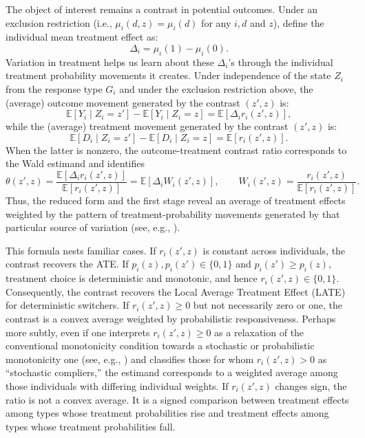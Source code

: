 \documentclass[11pt]{article}
\newcommand{\E}{\mathbb{E}}
\newcommand{\1}{\mathbf{1}}
\begin{document}
The object of interest remains a contrast in potential outcomes. Under an exclusion restriction (i.e., $\mu_i(d,z) = \mu_i(d)$ for any $i, d$ and $z$), define the individual mean treatment effect as:
\[
        \Delta_i=\mu_i(1)-\mu_i(0).
\]
Variation in treatment helps us learn about these $\Delta_i$'s through the individual treatment probability movements it creates. Under independence of the state $Z_i$ from the response type $G_i$ and under the exclusion restriction above, the (average) outcome movement generated by the contrast $(z',z)$ is:
\[
        \E[Y_i\mid Z_i=z']-\E[Y_i\mid Z_i=z] = \E[\Delta_i r_i(z',z)],
\]
while the (average) treatment movement generated by the contrast $(z',z)$ is:
\[
        \E[D_i\mid Z_i=z']-\E[D_i\mid Z_i=z] = \E[r_i(z',z)].
\]
When the latter is nonzero, the outcome-treatment contrast ratio corresponds to the Wald estimand and identifies
\begin{equation}
        \theta(z',z)
        =\frac{\E[\Delta_i r_i(z',z)]}{\E[r_i(z',z)]}=\E[\Delta_i W_i(z',z)],
        \qquad
        W_i(z',z)=\frac{r_i(z',z)}{\E[r_i(z',z)]}.
        \label{eq:introtheta}
\end{equation}
Thus, the reduced form and the first stage reveal an average of treatment effects weighted by the pattern of treatment-probability movements generated by that particular source of variation (see, e.g., \cite{dinardolee2011}).

This formula nests familiar cases. If $r_i(z',z)$ is constant across individuals, the contrast recovers the ATE. If $p_i(z),p_i(z')\in\{0,1\}$ and $p_i(z')\geq p_i(z)$, treatment choice is deterministic and monotonic, and hence $r_i(z',z)\in\{0,1\}$.  Consequently, the contrast recovers the Local Average Treatment Effect (LATE) \citep{imbensangrist1994} for deterministic switchers. If $r_i(z',z)\geq 0$ but not necessarily zero or one, the contrast is a convex average weighted by probabilistic responsiveness. Perhaps more subtly, even if one interprets $r_i(z',z) \ge 0$ as a relaxation of the conventional monotonicity condition towards a stochastic or probabilistic monotonicity one (see, e.g., \cite{dinardolee2011}) and classifies those for whom $r_i(z',z) > 0$ as ``stochastic compliers,'' the estimand corresponds to a weighted average among those individuals with differing individual weights.  If $r_i(z',z)$ changes sign, the ratio is not a convex average. It is a signed comparison between treatment effects among types whose treatment probabilities rise and treatment effects among types whose treatment probabilities fall.
\end{document}
